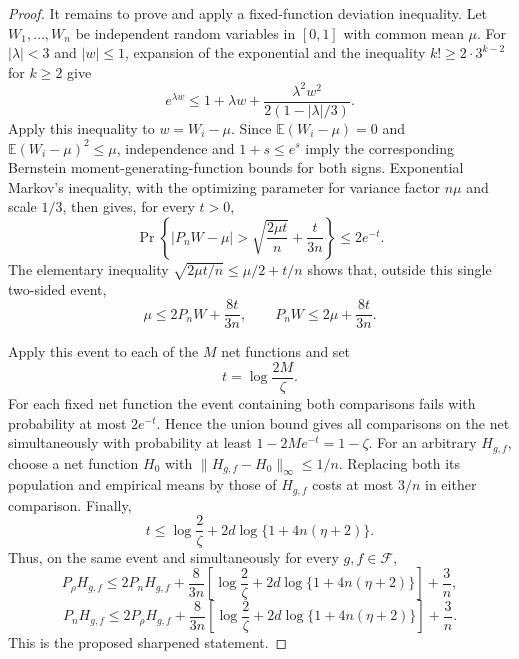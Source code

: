 \documentclass{article}
\begin{document}
\begin{proof}
It remains to prove and apply a fixed-function deviation inequality. Let \(W_1,\ldots,W_n\) be independent random variables in \([0,1]\) with common mean \(\mu\). For \(|\lambda|<3\) and \(|w|\le1\), expansion of the exponential and the inequality \(k!\ge2\cdot3^{k-2}\) for \(k\ge2\) give
\[
e^{\lambda w}\le1+\lambda w+\frac{\lambda^2w^2}{2(1-|\lambda|/3)}.
\]
Apply this inequality to \(w=W_i-\mu\). Since \(\mathbb E(W_i-\mu)=0\) and \(\mathbb E(W_i-\mu)^2\le\mu\), independence and \(1+s\le e^s\) imply the corresponding Bernstein moment-generating-function bounds for both signs. Exponential Markov's inequality, with the optimizing parameter for variance factor \(n\mu\) and scale \(1/3\), then gives, for every \(t>0\),
\[
\Pr\left\{\left|P_nW-\mu\right|>\sqrt{\frac{2\mu t}{n}}+\frac{t}{3n}\right\}\le2e^{-t}.
\]
The elementary inequality \(\sqrt{2\mu t/n}\le\mu/2+t/n\) shows that, outside this single two-sided event,
\[
\mu\le2P_nW+\frac{8t}{3n},
\qquad
P_nW\le2\mu+\frac{8t}{3n}.
\]

Apply this event to each of the \(M\) net functions and set
\[
t=\log\frac{2M}{\zeta}.
\]
For each fixed net function the event containing both comparisons fails with probability at most \(2e^{-t}\). Hence the union bound gives all comparisons on the net simultaneously with probability at least \(1-2Me^{-t}=1-\zeta\). For an arbitrary \(H_{g,f}\), choose a net function \(H_0\) with \(\lVert H_{g,f}-H_0\rVert_\infty\le1/n\). Replacing both its population and empirical means by those of \(H_{g,f}\) costs at most \(3/n\) in either comparison. Finally,
\[
t\le\log\frac2\zeta+2d\log\{1+4n(\eta+2)\}.
\]
Thus, on the same event and simultaneously for every \(g,f\in\mathcal F\),
\[
P_\rho H_{g,f}\le2P_nH_{g,f}+\frac{8}{3n}\left[\log\frac2\zeta+2d\log\{1+4n(\eta+2)\}\right]+\frac3n,
\]
\[
P_nH_{g,f}\le2P_\rho H_{g,f}+\frac{8}{3n}\left[\log\frac2\zeta+2d\log\{1+4n(\eta+2)\}\right]+\frac3n.
\]
This is the proposed sharpened statement.
\end{proof}
\end{document}
